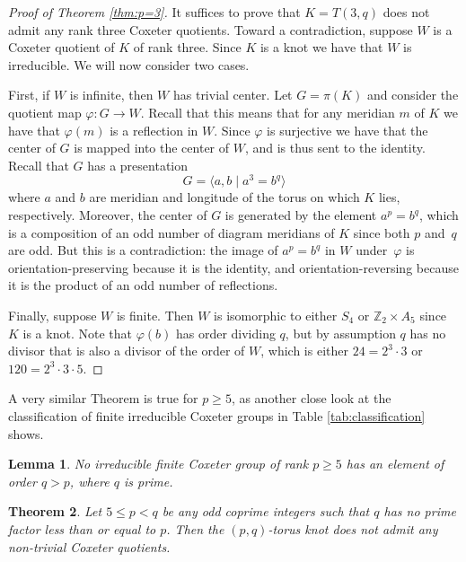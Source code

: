 \documentclass{article}
\newtheorem{theorem}{Theorem}[section]
\newtheorem{lemma}[theorem]{Lemma}
\theoremstyle{definition}
\begin{document}
\begin{proof}[Proof of Theorem \ref{thm:p=3}]
It suffices to prove that $K = T(3, q)$ does not admit any rank three Coxeter quotients. Toward a contradiction, suppose $W$ is a Coxeter quotient of $K$ of rank three. Since $K$ is a knot we have that $W$ is irreducible. We will now consider two cases.

First, if $W$ is infinite, then $W$ has trivial center. Let $G = \pi(K)$ and consider the quotient map $\varphi: G \rightarrow W$. Recall that this means that for any meridian $m$ of $K$ we have that $\varphi(m)$ is a reflection in $W$. Since $\varphi$ is surjective we have that the center of $G$ is mapped into the center of $W$, and is thus sent to the identity. Recall that $G$ has a presentation
$$G = \langle a, b \; | \; a^3 = b^q \rangle$$
where $a$ and $b$ are meridian and longitude of the torus on which $K$ lies, respectively. Moreover, the center of $G$ is generated by the element $a^p = b^q$, which is a composition of an odd number of diagram meridians of $K$ since both $p$ and~$q$ are odd. But this is a contradiction: the image of $a^p = b^q$ in $W$ under~$\varphi$ is orientation-preserving because it is the identity, and orientation-reversing because it is the product of an odd number of reflections.

Finally, suppose $W$ is finite. Then $W$ is isomorphic to either $S_4$ or $\mathbb{Z}_2 \times A_5$ since $K$ is a knot. Note that $\varphi(b)$ has order dividing $q$, but by assumption $q$ has no divisor that is also a divisor of the order of $W$, which is either $24 = 2^3 \cdot 3$ or $120 = 2^3 \cdot 3 \cdot 5$.
\end{proof}

A very similar Theorem is true for $p \geq 5$, as another close look at the classification of finite irreducible Coxeter groups in Table \ref{tab:classification} shows.

\begin{lemma}
No irreducible finite Coxeter group of rank $p \geq 5$ has an element of order $q > p$, where $q$ is prime.
\end{lemma}

\begin{theorem}
Let $5 \leq p < q$ be any odd coprime integers such that $q$ has no prime factor less than or equal to $p$. Then the $(p, q)$-torus knot does not admit any non-trivial Coxeter quotients.
\end{theorem}
\end{document}

